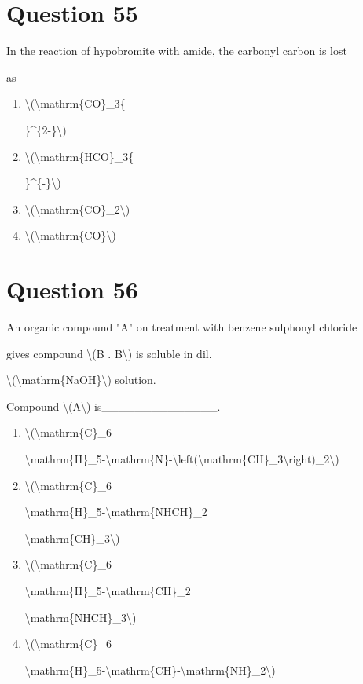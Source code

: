 \documentclass{article}
\begin{document}
\section*{Question 55}
In the reaction of hypobromite with amide, the carbonyl carbon is lost

as


\begin{enumerate}[label=(\alph*)]
\item \textbackslash(\textbackslash mathrm\{CO\}\_3\{

\}\^{}\{2-\}\textbackslash)


\item \textbackslash(\textbackslash mathrm\{HCO\}\_3\{

\}\^{}\{-\}\textbackslash)


\item \textbackslash(\textbackslash mathrm\{CO\}\_2\textbackslash)


\item \textbackslash(\textbackslash mathrm\{CO\}\textbackslash)


\end{enumerate}
\newpage
\section*{Question 56}
An organic compound "A" on treatment with benzene sulphonyl chloride

gives compound \textbackslash(B . B\textbackslash) is soluble in dil.

\textbackslash(\textbackslash mathrm\{NaOH\}\textbackslash) solution.~



Compound \textbackslash(A\textbackslash) is\_\_\_\_\_\_\_\_\_\_\_\_\_\_.


\begin{enumerate}[label=(\alph*)]
\item \textbackslash(\textbackslash mathrm\{C\}\_6

\textbackslash mathrm\{H\}\_5-\textbackslash mathrm\{N\}-\textbackslash left(\textbackslash mathrm\{CH\}\_3\textbackslash right)\_2\textbackslash)


\item \textbackslash(\textbackslash mathrm\{C\}\_6

\textbackslash mathrm\{H\}\_5-\textbackslash mathrm\{NHCH\}\_2

\textbackslash mathrm\{CH\}\_3\textbackslash)


\item \textbackslash(\textbackslash mathrm\{C\}\_6

\textbackslash mathrm\{H\}\_5-\textbackslash mathrm\{CH\}\_2

\textbackslash mathrm\{NHCH\}\_3\textbackslash)


\item \textbackslash(\textbackslash mathrm\{C\}\_6

\textbackslash mathrm\{H\}\_5-\textbackslash mathrm\{CH\}-\textbackslash mathrm\{NH\}\_2\textbackslash)


\end{enumerate}
\newpage
\end{document}
